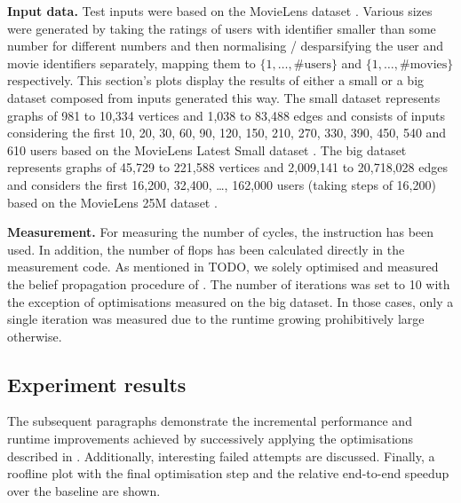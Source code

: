 \documentclass[letterpaper]{article}
\let\cref=\Cref %
\newcommand{\mypar}[1]{{\bf #1.}}
\begin{document}
\mypar{Input data} Test inputs were based on the MovieLens dataset \cite{movieLens}.
Various sizes were generated by taking the ratings of users with identifier smaller than some number for different numbers
and then normalising / desparsifying the user and movie identifiers separately, mapping them to $\{1, \ldots, \#\text{users}\}$ and $\{1, \ldots, \#\text{movies}\}$ respectively.
This section's plots display the results of either a small or a big dataset composed from inputs generated this way.
The small dataset represents graphs of 981 to 10,334 vertices and 1,038 to 83,488 edges and consists of inputs %
considering the first 10, 20, 30, 60, 90, 120, 150, 210, 270, 330, 390, 450, 540 and 610 users based on the MovieLens Latest Small dataset \cite{movieLensSmall}.
The big dataset represents graphs of 45,729 to 221,588 vertices and 2,009,141 to 20,718,028 edges and considers the first 16,200, 32,400, \dots, 162,000 users (taking steps of 16,200) based on the MovieLens 25M dataset \cite{movieLensBig}.

\mypar{Measurement} For measuring the number of cycles, the \verb@RDTSC@ instruction has been used.
In addition, the number of flops has been calculated directly in the measurement code.
As mentioned in TODO, we solely optimised and measured the belief propagation procedure of \cref{algo:propagate}. The number of iterations was set to 10 with the exception of optimisations  measured on the big dataset.
In those cases, only a single iteration was measured due to the runtime growing prohibitively large otherwise.\sr{*}

\subsection{Experiment results}  The subsequent paragraphs demonstrate the incremental performance and runtime improvements achieved by successively applying the optimisations described in \cref{sec:yourmethod}.
Additionally, interesting failed attempts are discussed.  
Finally, a roofline plot with the final optimisation step and the relative end-to-end speedup over the baseline  are shown.
\end{document}
